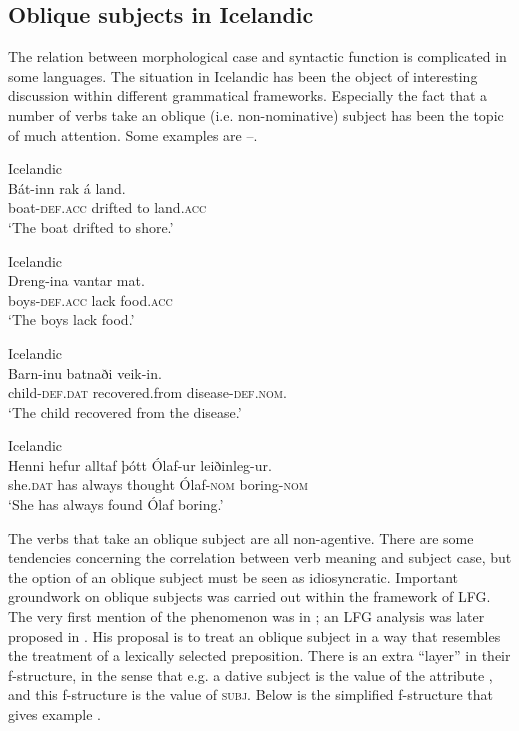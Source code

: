 \documentclass[output=paper,hidelinks]{langscibook}
\begin{document}
\subsection{Oblique subjects in Icelandic}
\label{sec:Scandinavian:3.1}

The relation between morphological case and syntactic function is complicated in some languages. The situation in Icelandic has been the object of interesting discussion within different grammatical frameworks. Especially the fact that a number of verbs take an oblique (i.e. non-nominative) subject has been the topic of much attention. Some examples are --.



\ea\label{ex:Scandinavian:33} Icelandic \citep[461]{Andrews82}\\
\gll
 {Bát-inn} {rak} {á} {land}\textsc{.}\\
 boat-\textsc{def.acc} drifted to land.\textsc{acc}\\
\glt `The boat drifted to shore.'\z


\ea\label{ex:Scandinavian:34} Icelandic \citep[461]{Andrews82}\\
\gll
 {Dreng-ina} {vantar} {mat.}\\
 boys-\textsc{def.acc} lack food.\textsc{acc}\\
\glt `The boys lack food.'\z



\ea\label{ex:Scandinavian:35} Icelandic \citep[462]{Andrews82}\\
\gll
 {Barn-inu} {batnaði} {veik-in.}\\
 child-\textsc{def.dat} recovered.from disease-\textsc{def.nom.}\\
\glt `The child recovered from the disease.'\z



\newpage
\ea\label{ex:Scandinavian:36} Icelandic \citep[100]{ZMT85:Case}\\
\gll
 {Henni} {hefur} {alltaf} {þótt} {Ólaf-ur} {leiðinleg-ur.}\\
 she.\textsc{dat} has always thought Ólaf\textsc{{}-nom} boring\textsc{{}-nom}\\
\glt `She has always found Ólaf boring.'\z

\noindent The verbs that take an oblique subject are all non-agentive. There are some tendencies concerning the correlation between verb meaning and subject case, but the option of an oblique subject must be seen as idiosyncratic. Important groundwork on oblique subjects was carried out within the framework of LFG. The very first mention of the phenomenon was in \citet{Andrews76:VP}; an LFG analysis was later proposed in \citet{Andrews82}. His proposal is to treat an oblique subject in a way that resembles the treatment of a lexically selected preposition. There is an extra ``layer'' in their f-structure, in the sense that e.g. a dative subject is the value of the attribute \DAT, and this f-structure is the value of \textsc{subj}. Below is the simplified f-structure that \citet[472]{Andrews82} gives example .
\end{document}

